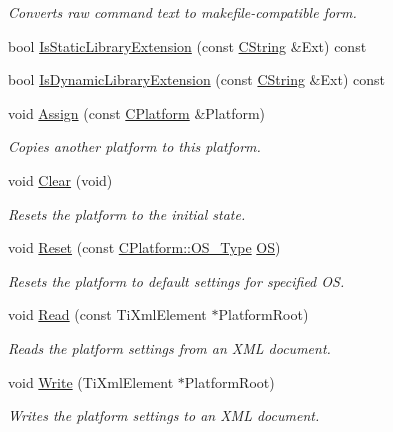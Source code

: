 \begin{DoxyCompactItemize}
\begin{DoxyCompactList}\small\item\em Converts raw command text to makefile-\/compatible form. \end{DoxyCompactList}\item 
bool \hyperlink{classCPlatform_a82f431a315ea566a34849340227ed636}{Is\-Static\-Library\-Extension} (const \hyperlink{classCString}{C\-String} \&Ext) const 
\item 
bool \hyperlink{classCPlatform_a1fd9daffce365c9072cf039bb7bb7c3e}{Is\-Dynamic\-Library\-Extension} (const \hyperlink{classCString}{C\-String} \&Ext) const 
\item 
void \hyperlink{classCPlatform_acaae2d317fff41a8aee9af83565faff4}{Assign} (const \hyperlink{classCPlatform}{C\-Platform} \&Platform)
\begin{DoxyCompactList}\small\item\em Copies another platform to this platform. \end{DoxyCompactList}\item 
void \hyperlink{classCPlatform_a556e7c94af3e2102c136d19ce2db6722}{Clear} (void)
\begin{DoxyCompactList}\small\item\em Resets the platform to the initial state. \end{DoxyCompactList}\item 
void \hyperlink{classCPlatform_a5303b45d02f2893c321d07d7cb9c7e31}{Reset} (const \hyperlink{classCPlatform_a2fb735c63c53052f79629e338bb0f535}{C\-Platform\-::\-O\-S\-\_\-\-Type} \hyperlink{classCPlatform_a5483e58aaa1fb254f18d04310d2b5901}{O\-S})
\begin{DoxyCompactList}\small\item\em Resets the platform to default settings for specified O\-S. \end{DoxyCompactList}\item 
void \hyperlink{classCPlatform_ab77735d189e48facffdd70e3ab302566}{Read} (const Ti\-Xml\-Element $\ast$Platform\-Root)
\begin{DoxyCompactList}\small\item\em Reads the platform settings from an X\-M\-L document. \end{DoxyCompactList}\item 
void \hyperlink{classCPlatform_afd86e8855cfdd6423fdbdde40b5adc73}{Write} (Ti\-Xml\-Element $\ast$Platform\-Root)
\begin{DoxyCompactList}\small\item\em Writes the platform settings to an X\-M\-L document. \end{DoxyCompactList}\item 

\end{DoxyCompactItemize}
